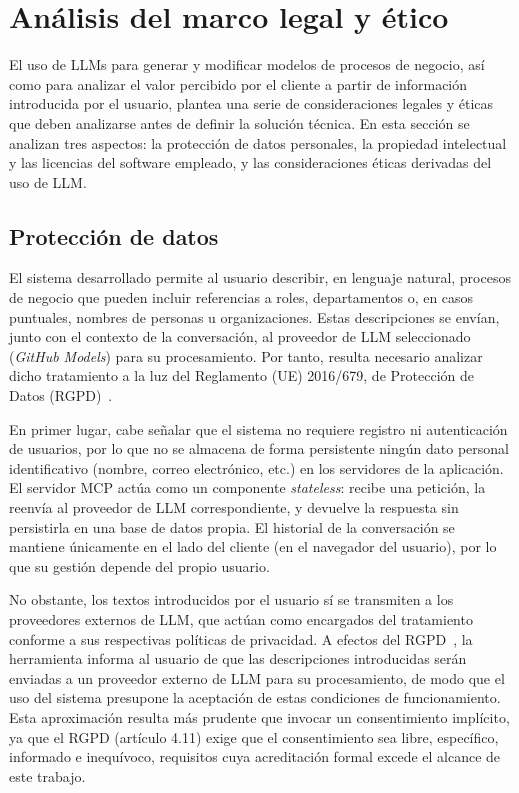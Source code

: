 {%
\section{Análisis del marco legal y ético}
\label{sec:marcoLegalEtico}

El uso de LLMs para generar y modificar modelos de procesos de negocio, así como para analizar el valor percibido por el cliente a partir de información introducida por el usuario, plantea una serie de consideraciones legales y éticas que deben analizarse antes de definir la solución técnica. En esta sección se analizan tres aspectos: la protección de datos personales, la propiedad intelectual y las licencias del software empleado, y las consideraciones éticas derivadas del uso de LLM.

\subsection{Protección de datos}
\label{subsec:proteccionDatos}

El sistema desarrollado permite al usuario describir, en lenguaje natural, procesos de negocio que pueden incluir referencias a roles, departamentos o, en casos puntuales, nombres de personas u organizaciones. Estas descripciones se envían, junto con el contexto de la conversación, al proveedor de LLM seleccionado (\textit{GitHub Models}) para su procesamiento. Por tanto, resulta necesario analizar dicho tratamiento a la luz del Reglamento (UE) 2016/679, de Protección de Datos (RGPD)~\cite{rgpd2016}.

En primer lugar, cabe señalar que el sistema no requiere registro ni autenticación de usuarios, por lo que no se almacena de forma persistente ningún dato personal identificativo (nombre, correo electrónico, etc.) en los servidores de la aplicación. El servidor MCP actúa como un componente \textit{stateless}: recibe una petición, la reenvía al proveedor de LLM correspondiente, y devuelve la respuesta sin persistirla en una base de datos propia. El historial de la conversación se mantiene únicamente en el lado del cliente (en el navegador del usuario), por lo que su gestión depende del propio usuario.

No obstante, los textos introducidos por el usuario sí se transmiten a los proveedores externos de LLM, que actúan como encargados del tratamiento conforme a sus respectivas políticas de privacidad. A efectos del RGPD~\cite{rgpd2016}, la herramienta informa al usuario de que las descripciones introducidas serán enviadas a un proveedor externo de LLM para su procesamiento, de modo que el uso del sistema presupone la aceptación de estas condiciones de funcionamiento. Esta aproximación resulta más prudente que invocar un consentimiento implícito, ya que el RGPD (artículo 4.11) exige que el consentimiento sea libre, específico, informado e inequívoco, requisitos cuya acreditación formal excede el alcance de este trabajo.


}
